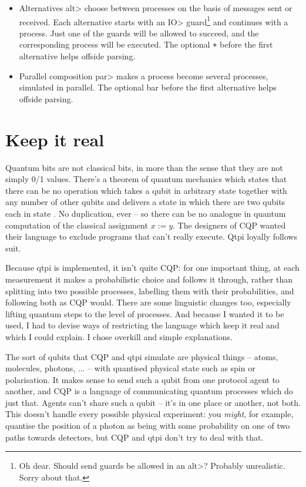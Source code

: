 \documentclass[11pt,a4paper]{book}
\newcommand{\verbtt}[1]{\texttt{\small{}#1}}
\begin{document}
\begin{itemize}
\item Alternatives \<alt> choose between processes on the basis of messages sent or received. Each alternative starts with an \<IO> guard\footnote{Oh dear. Should send guards be allowed in an \<alt>? Probably unrealistic. Sorry about that.} and continues with a process. Just one of the guards will be allowed to succeed, and the corresponding process will be executed. The optional \verbtt{+} before the first alternative helps offside parsing.
\item Parallel composition \<par> makes a process become several processes, simulated in parallel. The optional bar before the first alternative helps offside parsing.
\end{itemize}

\section{Keep it real}

Quantum bits are not classical bits, in more than the sense that they are not simply 0/1 values. There's a theorem of quantum mechanics which states that there can be no operation which takes a qubit in arbitrary state \bv{\phi} together with any number of other qubits and delivers a state in which there are two qubits each in state \bv{\phi}. No duplication, ever -- so there can be no analogue in quantum computation of the classical assignment $x:=y$. The designers of CQP \citep{GaySJ:comqp} wanted their language to exclude programs that can't really execute. Qtpi loyally follows suit.

Because qtpi is implemented, it isn't quite CQP: for one important thing, at each measurement it makes a probabilistic choice and follows it through, rather than splitting into two possible processes, labelling them with their probabilities, and following both as CQP would. There are some linguistic changes too, especially lifting quantum steps to the level of processes. And because I wanted it to be used, I had to devise ways of restricting the language which keep it real and which I could explain. I chose overkill and simple explanations. 

The sort of qubits that CQP and qtpi simulate are physical things -- atoms, molecules, photons, ... -- with quantised physical state such as spin or polarisation. It makes sense to send such a qubit from one protocol agent to another, and CQP is a language of communicating quantum processes which do just that. Agents can't share such a qubit -- it's in one place or another, not both. This doesn't handle every possible physical experiment: you \emph{might}, for example,  quantise the position of a photon as being with some probability on one of two paths towards detectors, but CQP and qtpi don't try to deal with that.
\end{document}
